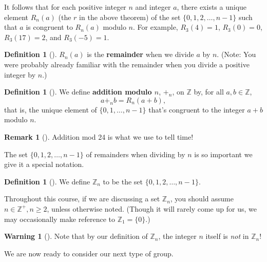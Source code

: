 \documentclass[10pt,openany,oneside]{book}
\newcommand{\terminology}[1]{\textbf{#1}}
\theoremstyle{plain}
\theoremstyle{definition}
\newtheorem{definition}[theorem]{Definition}
\theoremstyle{definition}
\newtheorem{remark}[theorem]{Remark}
\newtheorem{warning}[theorem]{Warning}
\theoremstyle{definition}
\theoremstyle{definition}
\numberwithin{equation}{section}
\def\Z{\mathbb{Z}}
\begin{document}
It follows that for each positive integer \(n\) and integer \(a\), there exists a unique element \(R_n(a)\) (the \(r\) in the above theorem) of the set \(\{0,1,2,\ldots, n-1\}\) such that \(a\) is congruent to \(R_n(a)\) modulo \(n\). For example, \(R_3(4)=1\), \(R_3(0)=0\), \(R_3(17)=2\), and \(R_3(-5)=1\).%
\begin{definition}[{}]\label{definition-24}
\label{notation-40}
\(R_n(a)\) is the \terminology{remainder} when we divide \(a\) by \(n\). (Note: You were probably already familiar with the remainder when you divide a positive integer by \(n\).)%
\end{definition}
\begin{definition}[{}]\label{definition-25}
\label{notation-41}
We define \terminology{addition modulo \(n\)}, \(+_n\), on \(\Z\) by, for all \(a,b\in \Z\),%
\begin{equation*}
a+_n b=R_n(a+b),
\end{equation*}
that is, the unique element of \(\{0,1,\ldots, n-1\}\) that's congruent to the integer \(a+b\) modulo \(n\).%
\end{definition}
\begin{remark}[]\label{remark-13}
Addition mod 24 is what we use to tell time!%
\end{remark}
The set \(\{0,1,2,\ldots, n-1\}\) of remainders when dividing by \(n\) is so important we give it a special notation.%
\begin{definition}[{}]\label{definition-26}
We define \(\Z_n\) to be the set \(\{0,1,2,\ldots,n-1\}\).%
\end{definition}
Throughout this course, if we are discussing a set \(\Z_n\), you should assume \(n\in \Z^+, n\geq 2\), unless otherwise noted. (Though it will rarely come up for us, we may occasionally make reference to \(\Z_1=\{0\}\).)%
\begin{warning}[]\label{warning-10}
Note that by our definition of \(\Z_n\), the integer \(n\) itself is \emph{not} in \(\Z_n\)!%
\end{warning}
We are now ready to consider our next type of group.%
\end{document}
